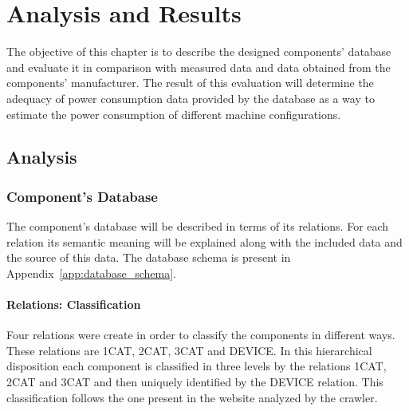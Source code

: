 

\chapter{Analysis and Results} \label{chap4:analysis_results}
%
    The objective of this chapter is to describe the designed components' database and evaluate it in comparison with measured data and data obtained from the components' manufacturer. The result of this evaluation will determine the adequacy of power consumption data provided by the database as a way to estimate the power consumption of different machine configurations.
    
\section{Analysis} \label{sec4:analysis}

\subsection{Component's Database} \label{sec4:component_database}
    The component's database will be described in terms of its relations. For each relation its semantic meaning will be explained along with the included data and the source of this data. The database schema is present in Appendix~\ref{app:database_schema}.

    \subsubsection*{Relations: Classification}
        Four relations were create in order to classify the components in different ways. These relations are 1CAT, 2CAT, 3CAT and DEVICE. In this hierarchical disposition each component is classified in three levels by the relations 1CAT, 2CAT and 3CAT and then uniquely identified by the DEVICE relation. This classification follows the one present in the website analyzed by the crawler.


